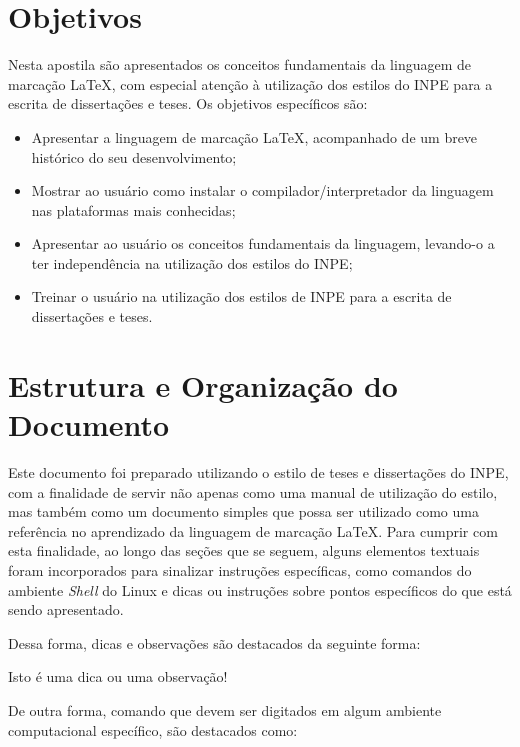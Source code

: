 \section{Objetivos}
\label{sec:objetivos}

Nesta apostila são apresentados os conceitos fundamentais da linguagem de marcação \LaTeX{}, com especial atenção à utilização dos estilos do INPE para a escrita de dissertações e teses. Os objetivos específicos são:

\begin{itemize}
    \item Apresentar a linguagem de marcação \LaTeX{}, acompanhado de um breve histórico do seu desenvolvimento;
    \item Mostrar ao usuário como instalar o compilador/interpretador da linguagem nas plataformas mais conhecidas;
    \item Apresentar ao usuário os conceitos fundamentais da linguagem, levando-o a ter independência na utilização dos estilos do INPE;
    \item Treinar o usuário na utilização dos estilos de INPE para a escrita de dissertações e teses.
\end{itemize}

\section{Estrutura e Organização do Documento}
\label{sec:estrutura}

Este documento foi preparado utilizando o estilo de teses e dissertações do INPE, com a finalidade de servir não apenas como uma manual de utilização do estilo, mas também como um documento simples que possa ser utilizado como uma referência no aprendizado da linguagem de marcação \LaTeX{}. Para cumprir com esta finalidade, ao longo das seções que se seguem, alguns elementos textuais foram incorporados para sinalizar instruções específicas, como comandos do ambiente \textit{Shell} do Linux e dicas ou instruções sobre pontos específicos do que está sendo apresentado. 

Dessa forma, dicas e observações são destacados da seguinte forma:

\begin{marker}
Isto é uma dica ou uma observação!
\end{marker}

De outra forma, comando que devem ser digitados em algum ambiente computacional específico, são destacados como:

